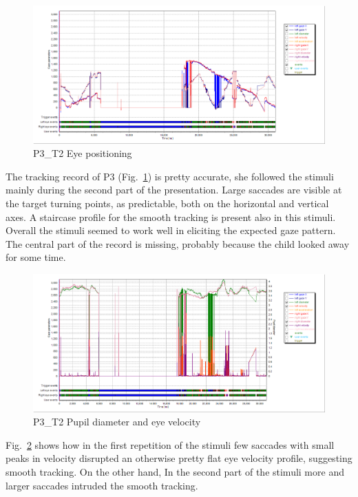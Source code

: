 \begin{figure}[h]
  \centering
  \includegraphics[width=.8\textwidth]{figures/graphs/P3_T2(triangular)_XY.png}
  \caption[P3\_T2 Eye positioning]{P3\_T2 Eye positioning}
  \label{fig:P3_T2_pos}
\end{figure}

The tracking record of P3 (Fig.~\ref{fig:P3_T2_pos}) is pretty accurate, she followed the stimuli mainly during the second part of the presentation. Large saccades are visible at the target turning points, as predictable, both on the horizontal and vertical axes. A staircase profile for the smooth tracking is present also in this stimuli. Overall the stimuli seemed to work  well in eliciting the expected gaze pattern. The central part of the record is missing, probably because the child looked away for some time.

\begin{figure}[h]
  \centering
  \includegraphics[width=.8\textwidth]{figures/graphs/P3_T2(triangular)_VP.png}
  \caption[P3\_T2 pupil velocity]{P3\_T2 Pupil diameter and eye velocity}
  \label{fig:P3_T2_vel}
\end{figure}

Fig.~\ref{fig:P3_T2_vel} shows how in the first repetition of the stimuli few saccades with small peaks in velocity disrupted an otherwise pretty flat eye velocity profile, suggesting smooth tracking. On the other hand, In the second part of the stimuli more and larger saccades intruded the smooth tracking.


